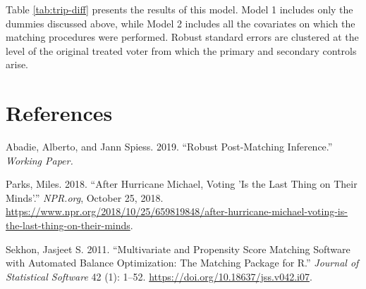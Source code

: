 \documentclass[
  12pt,
]{article}
\newlength{\cslhangindent}
\newenvironment{cslreferences}%
  {\setlength{\parindent}{0pt}%
  \everypar{\setlength{\hangindent}{\cslhangindent}}\ignorespaces}%
  {\par}
\begin{document}
Table \ref{tab:trip-diff} presents the results of this model. Model 1 includes only the dummies discussed above, while Model 2 includes all the covariates on which the matching procedures were performed. Robust standard errors are clustered at the level of the original treated voter from which the primary and secondary controls arise.

\begin{singlespace}


\end{singlespace}

\newpage

\hypertarget{references}{%
\section*{References}\label{references}}

\hypertarget{refs}{}
\begin{cslreferences}
\leavevmode\hypertarget{ref-Abadie2019}{}%
Abadie, Alberto, and Jann Spiess. 2019. ``Robust Post-Matching Inference.'' \emph{Working Paper.}

\leavevmode\hypertarget{ref-Parks2018}{}%
Parks, Miles. 2018. ``After Hurricane Michael, Voting 'Is the Last Thing on Their Minds'.'' \emph{NPR.org}, October 25, 2018. \url{https://www.npr.org/2018/10/25/659819848/after-hurricane-michael-voting-is-the-last-thing-on-their-minds}.

\leavevmode\hypertarget{ref-Sekhon2011}{}%
Sekhon, Jasjeet S. 2011. ``Multivariate and Propensity Score Matching Software with Automated Balance Optimization: The Matching Package for R.'' \emph{Journal of Statistical Software} 42 (1): 1--52. \url{https://doi.org/10.18637/jss.v042.i07}.
\end{cslreferences}
\end{document}
